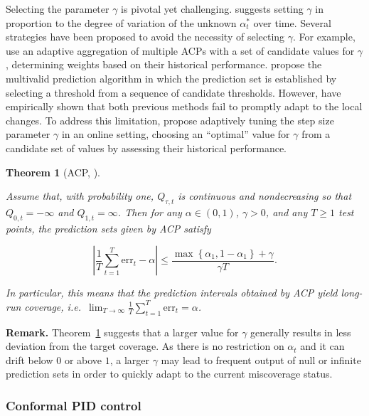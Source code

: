 \documentclass[
  11pt,
  a4paper,
]{article}
\theoremstyle{plain}
\theoremstyle{plain}
\newtheorem{theorem}{Theorem}[section]
\theoremstyle{remark}
\begin{document}
Selecting the parameter \(\gamma\) is pivotal yet challenging.
\textcite{gibbs2021} suggests setting \(\gamma\) in proportion to the
degree of variation of the unknown \(\alpha_{t}^{*}\) over time. Several
strategies have been proposed to avoid the necessity of selecting
\(\gamma\). For example, \textcite{zaffran2022} use an adaptive
aggregation of multiple ACPs with a set of candidate values for
\(\gamma\) , determining weights based on their historical performance.
\textcite{bastani2022} propose the multivalid prediction algorithm in
which the prediction set is established by selecting a threshold from a
sequence of candidate thresholds. However, \textcite{gibbs2022} have
empirically shown that both previous methods fail to promptly adapt to
the local changes. To address this limitation, \textcite{gibbs2022}
propose adaptively tuning the step size parameter \(\gamma\) in an
online setting, choosing an ``optimal'' value for \(\gamma\) from a
candidate set of values by assessing their historical performance.

\begin{theorem}[ACP,
\textcite{gibbs2021}]\protect\hypertarget{thm-acp}{}\label{thm-acp}

Assume that, with probability one, \(Q_{\tau, t}\) is continuous and
nondecreasing so that \(Q_{0, t}=-\infty\) and \(Q_{1, t}=\infty\). Then
for any \(\alpha\in(0,1)\), \(\gamma > 0\), and any \(T \geq 1\) test
points, the prediction sets given by ACP satisfy

\[
|\frac{1}{T}\sum_{t=1}^{T}\mathrm{err}_t - \alpha| \leq \frac{\max\left\{\alpha_1,1-\alpha_1\right\}+\gamma}{\gamma T}.
\]

In particular, this means that the prediction intervals obtained by ACP
yield long-run coverage,
i.e.~\(\lim _{T \rightarrow \infty} \frac{1}{T} \sum_{t=1}^T \mathrm{err}_t = \alpha\).

\end{theorem}

\textbf{Remark.} Theorem~\ref{thm-acp} suggests that a larger value for
\(\gamma\) generally results in less deviation from the target coverage.
As there is no restriction on \(\alpha_t\) and it can drift below \(0\)
or above \(1\), a larger \(\gamma\) may lead to frequent output of null
or infinite prediction sets in order to quickly adapt to the current
miscoverage status.

\subsubsection{Conformal PID control}\label{conformal-pid-control}
\end{document}
